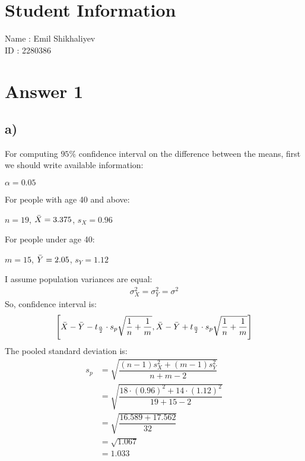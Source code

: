\documentclass[12pt]{article}
\begin{document}
\section*{Student Information}

Name : Emil Shikhaliyev\\
ID : 2280386\\

\section*{Answer 1}
\subsection*{a)}
For computing $95\%$  confidence interval on the difference between the means, first we should write available information: \\
\begin{center}
    $\alpha = 0.05$
\end{center}
For people with age 40 and above:
\begin{center}
    $n = 19$, $\Bar{X} = 3.375$, $s_{X} = 0.96$\\
\end{center}
For people under age 40: 
\begin{center}
    $m = 15$, $\Bar{Y} = 2.05$, $s_{Y} = 1.12$\\
\end{center}
I assume population variances are equal: 
\begin{equation}
    \begin{split}
        \sigma^{2}_{X} = \sigma^{2}_Y = \sigma^2
    \end{split}
\end{equation}
So, confidence interval is:
\begin{equation}
    \begin{split}
        \left[ \Bar{X} - \Bar{Y} - t_{\frac{\alpha}{2}} \cdot s_p \sqrt{\dfrac{1}{n}+\dfrac{1}{m}}, \Bar{X} - \Bar{Y} + t_{\frac{\alpha}{2}} \cdot s_p \sqrt{\dfrac{1}{n}+\dfrac{1}{m}} \right]
    \end{split}
\end{equation}
The pooled standard deviation is:
\begin{equation}
    \begin{split}
        s_p &= \sqrt{\dfrac{(n-1)s^{2}_X+(m-1)s^{2}_Y}{n+m-2}} \\
            &= \sqrt{\dfrac{18 \cdot (0.96)^2 + 14 \cdot (1.12)^2}{19+15-2}}\\
            &= \sqrt{\dfrac{16.589 + 17.562}{32}} \\
            &= \sqrt{1.067}\\
            &= 1.033
    \end{split}
\end{equation}
\end{document}
